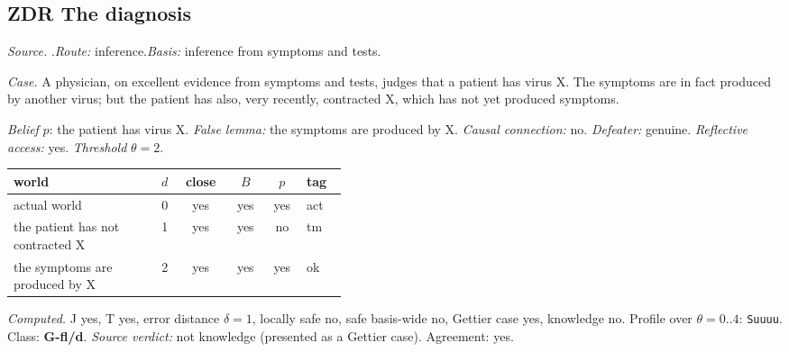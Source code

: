 \subsection*{ZDR \enspace The diagnosis}
\noindent\textit{Source.} \citet{Zagzebski1994}.\quad \textit{Route:} inference.\quad \textit{Basis:} inference from symptoms and tests.\par
\noindent\textit{Case.} A physician, on excellent evidence from symptoms and tests, judges that a patient has virus X. The symptoms are in fact produced by another virus; but the patient has also, very recently, contracted X, which has not yet produced symptoms.\par
\noindent\textit{Belief} $p$: the patient has virus X.
 \textit{False lemma:} the symptoms are produced by X. \textit{Causal connection:} no. \textit{Defeater:} genuine. \textit{Reflective access:} yes. \textit{Threshold} $\theta = 2$.\par
\begin{center}\begin{tabular}{@{}p{0.43\linewidth}rcccl@{}}
world & $d$ & close & $B$ & $p$ & tag \\ \midrule
actual world & 0 & yes & yes & yes & act \\
the patient has not contracted X & 1 & yes & yes & no & tm \\
the symptoms are produced by X & 2 & yes & yes & yes & ok \\
\end{tabular}\end{center}
\noindent\textit{Computed.} J yes, T yes, error distance $\delta = 1$, locally safe no, safe basis-wide no, Gettier case yes, knowledge no. Profile over $\theta = 0..4$: \texttt{Suuuu}. Class: \textbf{G-fl/d}.
 \textit{Source verdict:} not knowledge (presented as a Gettier case). Agreement: yes.
\par\medskip
{}

